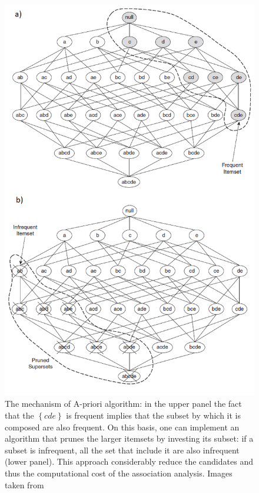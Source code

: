 \documentclass[12pt,%
               a4paper,%
               oneside,openany,%
               titlepage,%
               headinclude,footinclude,%
               BCOR5mm,%
               cleardoublepage=empty,%
               tablecaptionabove,%
               floatperchapter,
               ]{scrreprt}                 %
\begin{document}
\begin{figure}
\begin{center}
\includegraphics[width=\textwidth]{Figures/A-priori-ex.png}
\caption{The mechanism of A-priori algorithm: in the upper panel the fact that the $\left\lbrace cde \right\rbrace$ is frequent implies that the subset by which it is composed are also frequent. On this basis, one can implement an algorithm that prunes the larger itemsets by investing its subset: if a subset is infrequent, all the set that include it are also infrequent (lower panel). This approach considerably reduce the candidates and thus the computational cost of the association analysis. Images taken from \cite{tan2019introduction} }
\label{A-priori-ex}
\end{center}
\end{figure}
\end{document}
